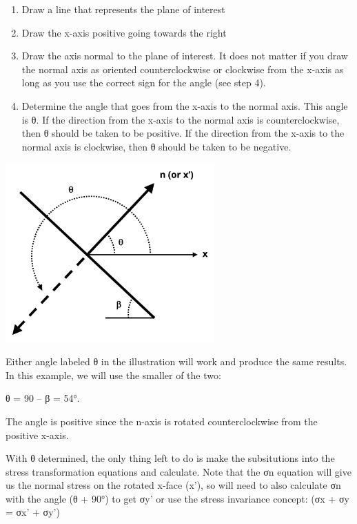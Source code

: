 \documentclass[
  letterpaper,
  DIV=11,
  numbers=noendperiod]{scrreprt}
\theoremstyle{definition}
\theoremstyle{remark}
\begin{document}
\begin{tcolorbox}
\begin{tcolorbox}
\begin{enumerate}
\def\labelenumi{\arabic{enumi}.}
\item
  Draw a line that represents the plane of interest
\item
  Draw the x-axis positive going towards the right
\item
  Draw the axis normal to the plane of interest. It does not matter if
  you draw the normal axis as oriented counterclockwise or clockwise
  from the x-axis as long as you use the correct sign for the angle (see
  step 4).
\item
  Determine the angle that goes from the x-axis to the normal axis. This
  angle is θ. If the direction from the x-axis to the normal axis is
  counterclockwise, then θ should be taken to be positive. If the
  direction from the x-axis to the normal axis is clockwise, then θ
  should be taken to be negative.
\end{enumerate}

\begin{center}
\includegraphics[width=3.15625in,height=\textheight]{images/CH12 figures/example 12.2 part 2.png}
\end{center}

Either angle labeled θ in the illustration will work and produce the
same results. In this example, we will use the smaller of the two:

θ = 90 -- β = 54°.

The angle is positive since the n-axis is rotated counterclockwise from
the positive x-axis.

With θ determined, the only thing left to do is make the subsitutions
into the stress transformation equations and calculate. Note that the σn
equation will give us the normal stress on the rotated x-face (x'), so
will need to also calculate σn with the angle (θ + 90°) to get σy' or
use the stress invariance concept: (σx + σy = σx' + σy')


\end{tcolorbox}
\end{tcolorbox}
\end{document}
